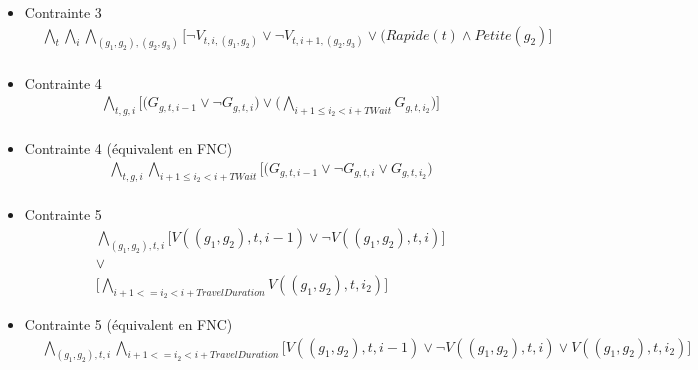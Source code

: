 \documentclass{article}
\begin{document}
\begin{itemize}
\item Contrainte 3
    \begin{equation*}
    \begin{split}
      & \bigwedge_{t}
      \bigwedge_{i}
      \bigwedge_{(g_1,g_2), (g_2, g_3)}  \big[
      \neg V_{t,i,(g_1,g_2)} \lor \neg V_{t,i+1,(g_2,g_3)} \lor (Rapide(t) \land Petite(g_2) \big] \\
    \end{split}
    \end{equation*}
    
\item Contrainte 4
    \begin{equation*}
    \begin{split}
      & \bigwedge_{t, g, i} \big[
      \big(G_{g, t, i-1} \lor \neg G_{g, t, i} \big)
      \lor 
      \big(\bigwedge_{i+1 \leq i_2<i+TWait} G_{g, t, i_2} \big) \big] \\
    \end{split}
    \end{equation*}
    
\item Contrainte 4 (équivalent en FNC)
    \begin{equation*}
    \begin{split}
      & \bigwedge_{t, g, i} \bigwedge_{i+1 \leq i_2<i+TWait} \big[
      \big(G_{g, t, i-1} \lor \neg G_{g, t, i} \lor G_{g, t, i_2} \big) \\
    \end{split}
    \end{equation*}

\item Contrainte 5
    \begin{equation*}
    \begin{split}
      & \bigwedge_{(g_1, g_2), t, i} \big[ V((g_1, g_2), t, i-1) \lor \neg V((g_1, g_2), t, i) \big]  \\
      & \lor\\
      & \big[ \bigwedge_{i+1<=i_2<i+TravelDuration} V((g_1, g_2), t, i_2) \big]
    \end{split}
    \end{equation*}
    
  
\item Contrainte 5 (équivalent en FNC)
    \begin{equation*}
    \begin{split}
      & \bigwedge_{(g_1, g_2), t, i} \bigwedge_{i+1<=i_2<i+TravelDuration} \big[ V((g_1, g_2), t, i-1) \lor \neg V((g_1, g_2), t, i) \lor V((g_1, g_2), t, i_2)\big] \\
    \end{split}
    \end{equation*}
    

\end{itemize}
\end{document}
